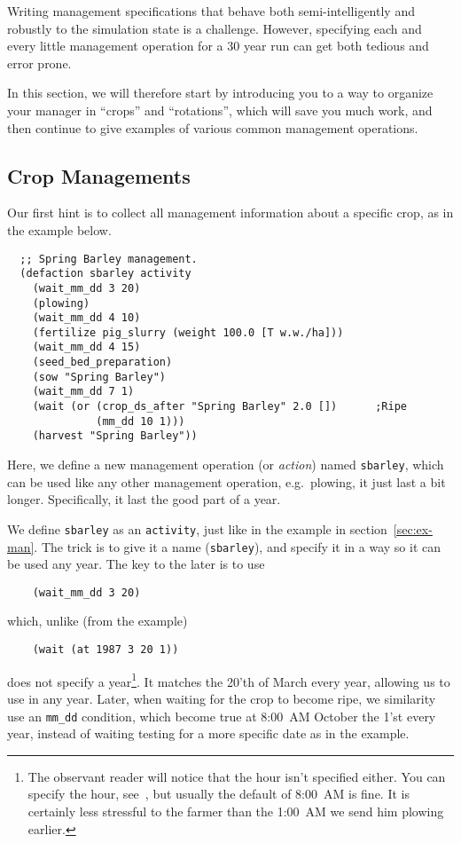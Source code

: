 \documentclass[a4paper,11pt]{article}
\begin{document}
Writing management specifications that behave both semi-intelligently
and robustly to the simulation state is a challenge.  However,
specifying each and every little management operation for a 30 year
run can get both tedious and error prone.

In this section, we will therefore start by introducing you to a way
to organize your manager in ``crops'' and ``rotations'', which will
save you much work, and then continue to give examples of various
common management operations.

\subsection{Crop Managements}
\label{sec:crop-man}

Our first hint is to collect all management information about a
specific crop, as in the example below.
\begin{verbatim}
  ;; Spring Barley management.
  (defaction sbarley activity
    (wait_mm_dd 3 20)
    (plowing)
    (wait_mm_dd 4 10)
    (fertilize pig_slurry (weight 100.0 [T w.w./ha]))
    (wait_mm_dd 4 15)
    (seed_bed_preparation)
    (sow "Spring Barley")
    (wait_mm_dd 7 1)
    (wait (or (crop_ds_after "Spring Barley" 2.0 [])      ;Ripe
              (mm_dd 10 1)))
    (harvest "Spring Barley"))
\end{verbatim}
Here, we define a new management operation (or \emph{action}) named
\texttt{sbarley}, which can be used like any other management
operation, e.g.\ plowing, it just last a bit longer.  Specifically, it
last the good part of a year.

We define \texttt{sbarley} as an \texttt{activity}, just like in the
example in section~\ref{sec:ex-man}.  The trick is to give it a name
(\texttt{sbarley}), and specify it in a way so it can be used any
year.  The key to the later is to use
\begin{verbatim}
    (wait_mm_dd 3 20)
\end{verbatim}
which, unlike (from the example)
\begin{verbatim}
    (wait (at 1987 3 20 1))
\end{verbatim}
does not specify a year\footnote{The observant reader will notice that
  the hour isn't specified either.  You can specify the hour,
  see~\cite{dina81}, but usually the default of 8:00~AM is fine.  It
  is certainly less stressful to the farmer than the 1:00~AM we send
  him plowing earlier.}.  It matches the 20'th of March every year,
allowing us to use in any year.  Later, when waiting for the crop to
become ripe, we similarity use an \texttt{mm\_dd} condition, which
become true at 8:00~AM October the 1'st every year, instead of waiting
testing for a more specific date as in the example.
\end{document}
